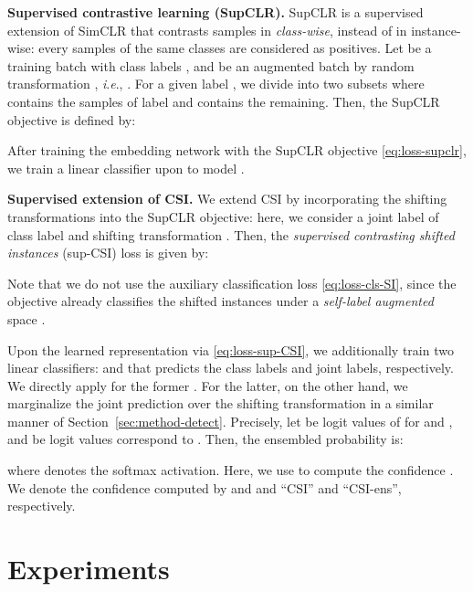 \documentclass{article}
\newcommand{\ie}{\textit{i}.\textit{e}.}
\begin{document}
\textbf{Supervised contrastive learning (SupCLR).} SupCLR is a supervised extension of SimCLR that contrasts samples in \emph{class-wise}, instead of in instance-wise: every samples of the same classes are considered as positives. Let  be a training batch with class labels , and  be an augmented batch by random transformation , \ie, . For a given label , we divide  into two subsets  where  contains the samples of label  and  contains the remaining. Then, the SupCLR objective is defined by:

After training the embedding network  with the SupCLR objective \eqref{eq:loss-supclr}, we train a linear classifier upon  to model . 


\textbf{Supervised extension of CSI.} We extend CSI by incorporating the shifting transformations  into the SupCLR objective: here, we consider a joint label  of class label  and shifting transformation . 
Then, the \textit{supervised contrasting shifted instances} (sup-CSI) loss is given by:

Note that we do not use the auxiliary classification loss  \eqref{eq:loss-cls-SI}, since the objective already classifies the shifted instances under a \textit{self-label augmented} \citep{lee2020selfsupervised} space .


Upon the learned representation via \eqref{eq:loss-sup-CSI}, we additionally train two linear classifiers:  and  that predicts the class labels and joint labels, respectively. We directly apply  for the former . For the latter, on the other hand, we marginalize the joint prediction over the shifting transformation in a similar manner of Section~\ref{sec:method-detect}. Precisely, let  be logit values of  for  and , and  be logit values correspond to . Then, the ensembled probability is:

where  denotes the softmax activation. Here, we use  to compute the confidence . We denote the confidence computed by  and  and ``CSI'' and ``CSI-ens'', respectively.

 \section{Experiments}
\label{sec:exp}
\end{document}
